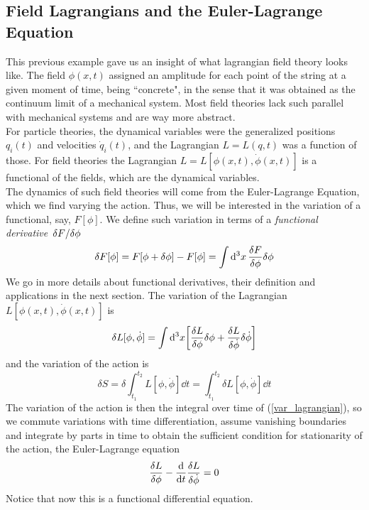 \subsection{Field Lagrangians and the Euler-Lagrange Equation}
This previous example gave us an insight of what lagrangian field theory looks like. The field $\phi(x,t)$ assigned an amplitude for each point of the string at a given moment of time, being ``concrete", in the sense that it was obtained as the continuum limit of a mechanical system. Most field theories lack such parallel with mechanical systems and are way more abstract.\\

For particle theories, the dynamical variables were the generalized positions $q_i(t)$ and velocities $\dot{q}_i(t)$, and the Lagrangian $L=L(q,t)$ was a function of those. For field theories the Lagrangian $L=L[\phi(x,t),\dot{\phi}(x,t)]$ is a functional of the fields, which are the dynamical variables.\\

The dynamics of such field theories will come from the Euler-Lagrange Equation, which we find varying the action. Thus, we will be interested in the variation of a functional, say, $F[\phi]$. We define such variation in terms of a \textit{functional derivative} $\fdv*{F}{\phi}$
\begin{equation}
    \delta F[\phi]=F[\phi+\delta\phi]-F[\phi]=\int\dd^3x\,\fdv{F}{\phi}\delta\phi
\end{equation}
We go in more details about functional derivatives, their definition and applications in the next section.
The variation of the Lagrangian $L[\phi(x,t),\dot{\phi}(x,t)]$ is
\begin{equation}
    \delta L[\phi,\dot{\phi}]=\int\dd^3x\qty[\fdv{L}{\phi}\delta\phi+\fdv{L}{\dot{\phi}}\delta\dot{\phi}]
    \label{var_lagrangian}
\end{equation}
and the variation of the action is
\begin{equation}
    \delta S=\delta\int_{t_1}^{t_2}L[\phi,\dot{\phi}]\dd t=\int_{t_1}^{t_2}\delta L[\phi,\dot{\phi}]\dd t
\end{equation}
The variation of the action is then the integral over time of (\ref{var_lagrangian}), so we commute variations with time differentiation, assume vanishing boundaries and integrate by parts in time to obtain the sufficient condition for stationarity of the action, the Euler-Lagrange equation
\begin{equation}
    \fdv{L}{\phi}-\dv{t}\fdv{L}{\dot{\phi}}=0
    \label{functionl_euler_lagrange}
\end{equation}
Notice that now this is a functional differential equation.
